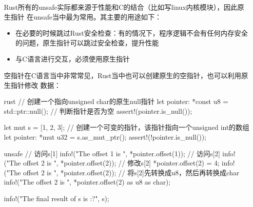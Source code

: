 Rust所有的unsafe实际都来源于性能和C的结合（比如写linux内核模块），因此原生指针
在unsafe当中最为常用。其主要的用途如下：
\begin{itemize}
  \item 在必要的时候跳过Rust安全检查：有的情况下，程序逻辑不会有任何内存安全的问题，原生指针可以跳过安全检查，提升性能
  \item 与C语言进行交互，必须使用原生指针
\end{itemize}

空指针在C语言当中非常常见，Rust当中也可以创建原生的空指针，也可以利用原生指针修改
数据：
\begin{code-block}{rust}
// 创建一个指向unsigned char的原生null指针
let pointer: *const u8 = std::ptr::null();
// 判断指针是否为空
assert!(pointer.is_null());

let mut s = [1, 2, 3];
// 创建一个可变的指针，该指针指向一个unsigned int的数组
let pointer: *mut u32 = s.as_mut_ptr();
assert!(!pointer.is_null());

unsafe {
    // 访问s[1]
    info!("The offset 1 is {}", *pointer.offset(1));
    // 访问s[2]
    info!("The offset 2 is {}", *pointer.offset(2));
    // 修改s[2]
    *pointer.offset(2) = 4;
    info!("The offset 2 is {}", *pointer.offset(2));
    // 将s[2]先转换成u8，然后再转换成char
    info!("The offset 2 is {}", *pointer.offset(2) as u8 as char);
}

info!("The final result of s is {:?}", s);
\end{code-block}

